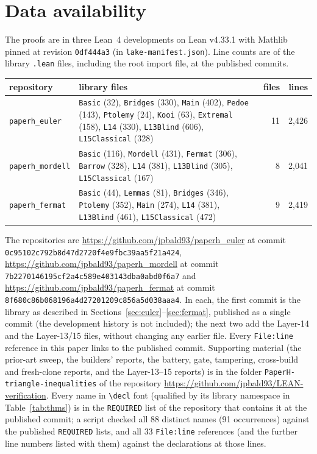 \documentclass[11pt]{article}
\theoremstyle{definition}
\theoremstyle{remark}
\newcommand{\lean}[1]{\texttt{#1}}
\begin{document}
\section{Data availability}\label{sec:avail}
The proofs are in three Lean~4 developments on Lean v4.33.1 with Mathlib pinned at revision
\texttt{0df444a3} (in \lean{lake-manifest.json}). Line counts are of the library \lean{.lean} files,
including the root import file, at the published commits.
\begin{center}\small
\begin{tabular}{lp{8.4cm}rr}
\toprule
repository & library files & files & lines\\
\midrule
\lean{paperh\_euler} & \lean{Basic} (32), \lean{Bridges} (330), \lean{Main} (402), \lean{Pedoe} (143), \lean{Ptolemy} (24), \lean{Kooi} (63), \lean{Extremal} (158), \lean{L14} (330), \lean{L13Blind} (606), \lean{L15Classical} (328) & 11 & 2{,}426\\
\lean{paperh\_mordell} & \lean{Basic} (116), \lean{Mordell} (431), \lean{Fermat} (306), \lean{Barrow} (328), \lean{L14} (381), \lean{L13Blind} (305), \lean{L15Classical} (167) & 8 & 2{,}041\\
\lean{paperh\_fermat} & \lean{Basic} (44), \lean{Lemmas} (81), \lean{Bridges} (346), \lean{Ptolemy} (352), \lean{Main} (274), \lean{L14} (381), \lean{L13Blind} (461), \lean{L15Classical} (472) & 9 & 2{,}419\\
\bottomrule
\end{tabular}
\end{center}
The repositories are \url{https://github.com/jpbald93/paperh_euler} at commit
\texttt{0c95102c792b8d47d2720f4e9fbc39aa5f21a424},
\url{https://github.com/jpbald93/paperh_mordell} at commit
\texttt{7b2270146195cf2a4c589e403143dba0abd0f6a7} and
\url{https://github.com/jpbald93/paperh_fermat} at commit
\texttt{8f680c86b068196a4d27201209c856a5d038aaa4}. In each, the first commit is the library as
described in Sections~\ref{sec:euler}--\ref{sec:fermat}, published as a single commit (the
development history is not included); the next two add the Layer-14 and the Layer-13/15 files,
without changing any earlier file. Every \texttt{File:line} reference in this paper links to the
published commit. Supporting material (the prior-art sweep, the builders' reports, the battery, gate,
tampering, cross-build and fresh-clone reports, and the Layer-13--15 reports) is in the folder
\lean{PaperH-triangle-inequalities} of the repository
\url{https://github.com/jpbald93/LEAN-verification}. Every name in \lean{\textbackslash decl} font
(qualified by its library namespace in Table~\ref{tab:thms}) is in the \lean{REQUIRED} list of the
repository that contains it at the published commit; a script checked all 88 distinct names (91
occurrences) against the published \lean{REQUIRED} lists, and all 33 \texttt{File:line} references
(and the further line numbers listed with them) against the declarations at those lines.
\end{document}
